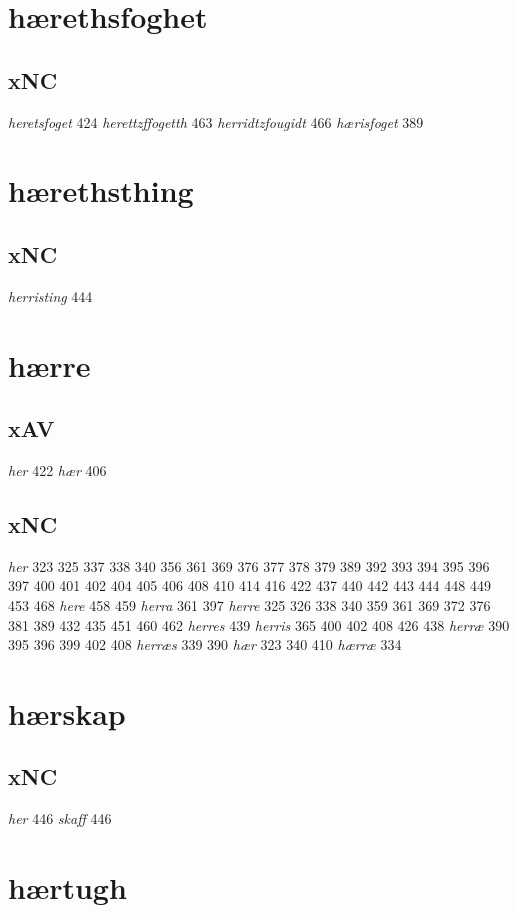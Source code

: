 \documentclass[a4paper,twocolumn]{article}
\begin{document}
\section{hærethsfoghet}
\label{sec:org3f7f6cf}
\subsection{xNC}
\label{sec:orgc58ef25}
\emph{heretsfoget} 424 \emph{herettzffogetth} 463 \emph{herridtzfougidt} 466 \emph{hærisfoget} 389 
\section{hærethsthing}
\label{sec:orgc8595d3}
\subsection{xNC}
\label{sec:org704109f}
\emph{herristing} 444 
\section{hærre}
\label{sec:org8b6abe2}
\subsection{xAV}
\label{sec:org45741c0}
\emph{her} 422 \emph{hær} 406 
\subsection{xNC}
\label{sec:orgf95462d}
\emph{her} 323 325 337 338 340 356 361 369 376 377 378 379 389 392 393 394 395 396 397 400 401 402 404 405 406 408 410 414 416 422 437 440 442 443 444 448 449 453 468 \emph{here} 458 459 \emph{herra} 361 397 \emph{herre} 325 326 338 340 359 361 369 372 376 381 389 432 435 451 460 462 \emph{herres} 439 \emph{herris} 365 400 402 408 426 438 \emph{herræ} 390 395 396 399 402 408 \emph{herræs} 339 390 \emph{hær} 323 340 410 \emph{hærræ} 334 
\section{hærskap}
\label{sec:orge8896da}
\subsection{xNC}
\label{sec:org81365cf}
\emph{her} 446 \emph{skaff} 446 
\section{hærtugh}
\label{sec:orgd380d83}
\end{document}
